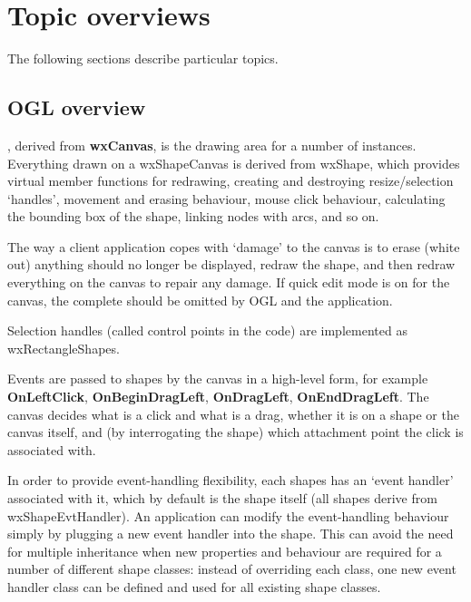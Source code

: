 \chapter{Topic overviews}
%
\setfooter{\thepage}{}{}{}{}{\thepage}

The following sections describe particular topics.

\section{OGL overview}\label{ogloverview}

, derived from {\bf wxCanvas}, is the drawing area
for a number of  instances. Everything drawn on a
wxShapeCanvas is derived from wxShape, which provides virtual
member functions for redrawing, creating and destroying
resize/selection `handles', movement and erasing behaviour, mouse
click behaviour, calculating the bounding box of the shape, linking
nodes with arcs, and so on.

The way a client application copes with `damage' to the canvas is to
erase (white out) anything should no longer be displayed, redraw the shape,
and then redraw everything on the canvas to repair any damage. If quick edit
mode is on for the canvas, the complete should be omitted by OGL and the
application.

Selection handles (called control points in the code) are implemented as
wxRectangleShapes.

Events are passed to shapes by the canvas in a high-level form, for example {\bf OnLeftClick},
{\bf OnBeginDragLeft}, {\bf OnDragLeft}, {\bf OnEndDragLeft}. The canvas decides
what is a click and what is a drag, whether it is on a shape or the canvas itself,
and (by interrogating the shape) which attachment point the click is associated with.

In order to provide event-handling flexibility, each shapes has an `event handler' associated with it,
which by default is the shape itself (all shapes derive from wxShapeEvtHandler).
An application can modify the event-handling behaviour simply by plugging a new
event handler into the shape. This can avoid the need for multiple inheritance when
new properties and behaviour are required for a number of different shape classes: instead
of overriding each class, one new event handler class can be defined and used for all
existing shape classes.

